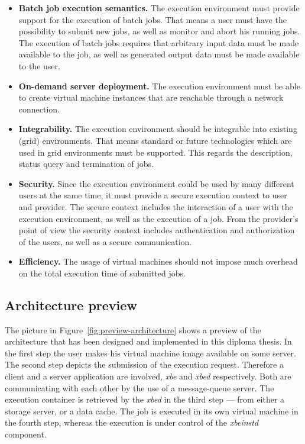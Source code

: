 \begin{itemize}
\item  \textbf{Batch job execution  semantics.} The  execution environment
  must provide support for the execution of batch jobs. That means a user
  must have  the possibility to  submit new jobs,  as well as  monitor and
  abort  his running  jobs.  The  execution  of batch  jobs requires  that
  arbitrary  input data  must be  made available  to the  job, as  well as
  generated output data must be made available to the user.

\item \textbf{On-demand server deployment.} The execution environment must
  be able to create virtual machine instances that are reachable through a
  network connection.

\item  \textbf{Integrability.}    The  execution  environment   should  be
  integrable into  existing (grid)  environments.  That means  standard or
  future  technologies  which  are  used  in  grid  environments  must  be
  supported.  This  regards the description, status  query and termination
  of jobs.

\item \textbf{Security.} Since the  execution environment could be used by
  many  different  users  at the  same  time,  it  must provide  a  secure
  execution context to user and provider.  The secure context includes the
  interaction of  a user with the  execution environment, as  well as the
  execution  of a  job. From  the provider's  point of  view  the security
  context includes authentication and  authorization of the users, as well
  as a secure communication.

\item \textbf{Efficiency.} The usage of virtual machines should not impose
  much overhead  on the total  execution time of submitted  jobs.
\end{itemize}

\subsection*{Architecture preview}

The  picture in Figure~\ref{fig:preview-architecture}  shows a  preview of
the architecture  that has been  designed and implemented in  this diploma
thesis.   In the  first  step the  user  makes his  virtual machine  image
available on some  server.  The second step depicts  the submission of the
execution  request.   Therefore a  client  and  a  server application  are
involved, \emph{xbe} and \emph{xbed} respectively.  Both are communicating
with  each other  by the  use of  a message-queue  server.   The execution
container  is retrieved  by the  \emph{xbed} in  the third  step  --- from
either a storage server, or a data  cache.  The job is executed in its own
virtual machine in the fourth step, whereas the execution is under control
of the \emph{xbeinstd} component.

